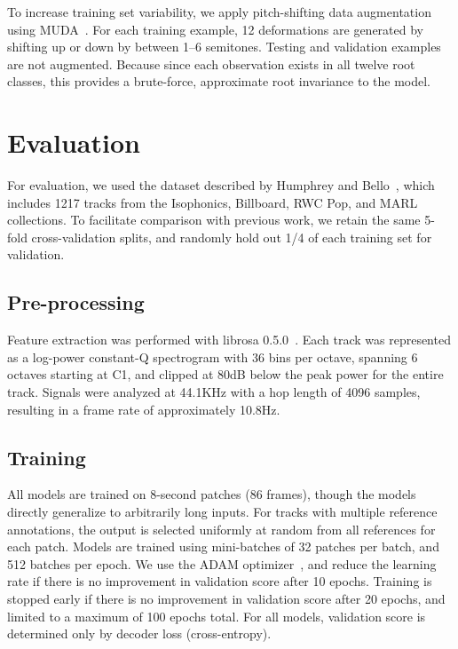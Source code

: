 \documentclass{article}
\begin{document}
To increase training set variability, we apply pitch-shifting data augmentation using MUDA~\cite{mcfee2015software}.
For each training example, 12 deformations are generated by shifting up or down by between 1--6 semitones.
Testing and validation examples are not augmented.
Because since each observation exists in all twelve root classes, this provides a brute-force, approximate root invariance to the model.


\section{Evaluation}

For evaluation, we used the dataset described by Humphrey and Bello~\cite{humphrey2015four}, which includes 1217 tracks from the Isophonics, Billboard, RWC Pop, and MARL collections.
To facilitate comparison with previous work, we retain the same 5-fold cross-validation splits, and randomly hold out 1/4 of each training set for validation.

\subsection{Pre-processing}

Feature extraction was performed with librosa 0.5.0~\cite{librosa050}.
Each track was represented as a log-power constant-Q spectrogram with 36 bins per octave, spanning 6 octaves starting at C1, and clipped at 80dB below the peak power for the entire track.
Signals were analyzed at 44.1KHz with a hop length of 4096 samples, resulting in a frame rate of approximately 10.8Hz.

\subsection{Training}
All models are trained on 8-second patches (86 frames), though the models directly generalize to arbitrarily long inputs.
For tracks with multiple reference annotations, the output is selected uniformly at random from all references for each patch.
Models are trained using mini-batches of 32 patches per batch, and 512 batches per epoch.
We use the ADAM optimizer~\cite{kingma2014adam}, and reduce the learning rate if there is no improvement in validation score after 10 epochs.
Training is stopped early if there is no improvement in validation score after 20 epochs, and limited to a maximum of 100 epochs total.
For all models, validation score is determined only by decoder loss (cross-entropy).
\end{document}
